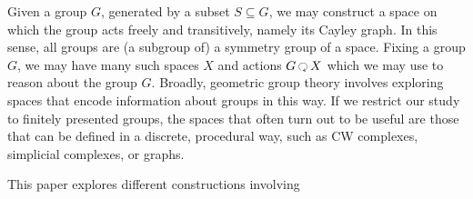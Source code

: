 Given a group $G$, generated by a subset $S \subseteq G$, we may construct a space on which the group acts freely and transitively, namely its Cayley graph.
In this sense, all groups are (a subgroup of) a symmetry group of a space.
Fixing a group $G$, we may have many such spaces $X$ and actions $G \acts X$  which we may use to reason about the group $G$.
Broadly, geometric group theory involves exploring spaces that encode information about groups in this way.
If we restrict our study to finitely presented groups, the spaces that often turn out to be useful are those that can be defined in a discrete, procedural way, such as CW complexes, simplicial complexes, or graphs.

This paper explores different constructions involving
